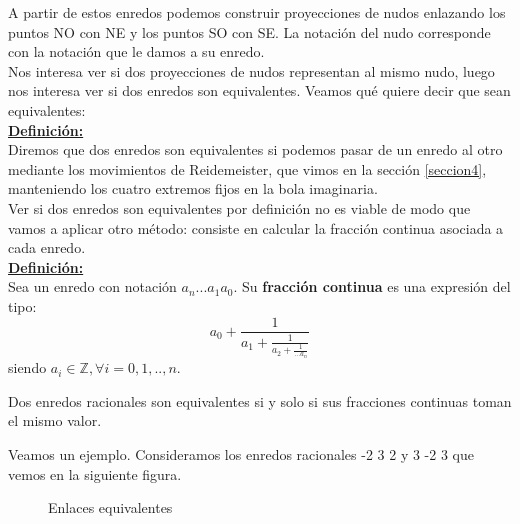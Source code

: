 \documentclass[14pt]{extarticle}
\begin{document}
A partir de estos enredos podemos construir proyecciones de nudos enlazando los puntos NO con NE y los puntos SO con SE. La notación del nudo corresponde con la notación que le damos a su enredo.\\ 

Nos interesa ver si dos proyecciones de nudos representan al mismo nudo, luego nos interesa ver si dos enredos son equivalentes. Veamos qué quiere decir que sean equivalentes:\\

\underline{\textbf{Definición:}}\\
Diremos que dos enredos son equivalentes si podemos pasar de un enredo al otro mediante los movimientos de Reidemeister, que vimos en la sección \ref{seccion4}, manteniendo los cuatro extremos fijos en la bola imaginaria. \\

Ver si dos enredos son equivalentes por definición no es viable de modo que vamos a aplicar otro método: consiste en calcular la fracción continua asociada a cada enredo.\\

\underline{\textbf{Definición:}}\\
Sea un enredo con notación $a_{n}...a_{1}a_{0}$. Su\textbf{ fracción continua} es una expresión del tipo:
\begin{equation}
    a_{0} + \frac{1}{a_{1} + \frac{1}{a_{2} + \frac{1}{...a_{n}}}}
\end{equation}
siendo $a_{i} \in \mathds{Z},  \forall i = 0,1,..,n.$\\

\begin{teo}
Dos enredos racionales son equivalentes si y solo si sus fracciones continuas toman el mismo valor. 
\end{teo}

Veamos un ejemplo. Consideramos los enredos racionales -2 3 2 y 3 -2 3 que vemos en la siguiente figura.\\
\begin{figure}[h!]
	\centering
	\space
	\caption{Enlaces equivalentes}
	\label{conw5} 
\end{figure}
\end{document}
